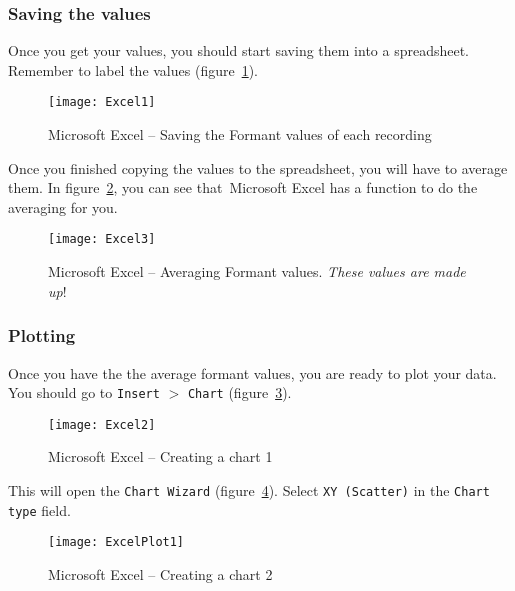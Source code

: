 \documentclass{article}
\newcommand{\soft}[1]{\textsf{#1}}
\newcommand{\softmenu}[1]{\texttt{#1}}
\newcommand{\MSExcel}{\soft{Microsoft\texttrademark{} Excel}}
\begin{document}
\subsubsection{Saving the values}
Once you get your values, you should start saving them into a spreadsheet. Remember to label the values (figure~\ref{step1save}).

\begin{figure}[!tbp]
\caption{\MSExcel{} -- Saving the Formant values of each recording}
\label{step1save}
	\begin{center}
		\texttt{[image: Excel1]}
	\end{center}
\end{figure}

Once you finished copying the values to the spreadsheet, you will have to average them. In figure~\ref{step2save}, you can see that~\MSExcel{} has a function to do the averaging for you.

\begin{figure}[!tbp]
\caption{\MSExcel{} -- Averaging Formant values. \emph{These values are made up}!}
\label{step2save}
	\begin{center}
		\texttt{[image: Excel3]}
	\end{center}
\end{figure}


\subsubsection{Plotting}

Once you have the the average formant values, you are ready to plot your data. You should go to \softmenu{Insert} $>$ \softmenu{Chart} (figure~\ref{step1plot}).

\begin{figure}[!tbp]
\caption{\MSExcel{} -- Creating a chart 1}
\label{step1plot}
	\begin{center}
		\texttt{[image: Excel2]}
	\end{center}
\end{figure}

This will open the \softmenu{Chart Wizard} (figure~\ref{step2plot}). Select \softmenu{XY (Scatter)} in the \softmenu{Chart type} field.

\begin{figure}[!tbp]
\caption{\MSExcel{} -- Creating a chart 2}
\label{step2plot}
	\begin{center}
		\texttt{[image: ExcelPlot1]}
	\end{center}
\end{figure}
\end{document}
